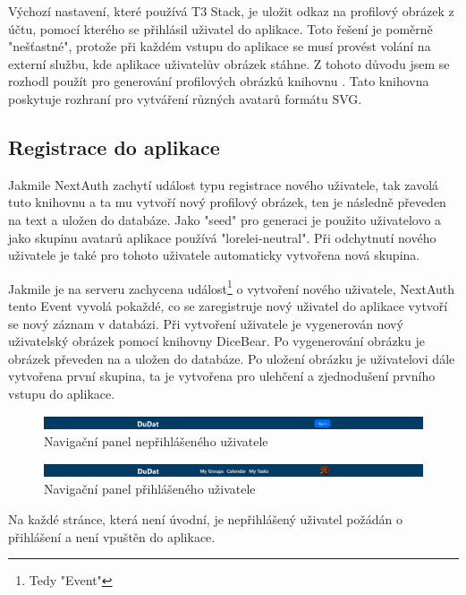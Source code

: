 Výchozí nastavení, které používá T3 Stack, je uložit odkaz na profilový obrázek z účtu, pomocí kterého se přihlásil uživatel do aplikace. Toto řešení je poměrně "nešťastné", protože při každém vstupu do aplikace se musí provést volání na externí službu, kde aplikace uživatelův obrázek stáhne. Z tohoto důvodu jsem se rozhodl použít pro generování profilových obrázků knihovnu \cite{dicebear}. Tato knihovna poskytuje rozhraní pro vytváření různých avatarů formátu SVG.

\subsection{Registrace do aplikace}
Jakmile NextAuth zachytí událost typu registrace nového uživatele, tak zavolá tuto knihovnu a ta mu vytvoří nový profilový obrázek, ten je následně převeden na text a uložen do databáze. Jako "seed" pro generaci je použito uživatelovo  a jako skupinu avatarů aplikace používá "lorelei-neutral"\cite{lorelei-neutral}. Při odchytnutí nového uživatele je také pro tohoto uživatele automaticky vytvořena nová skupina.

Jakmile je na serveru zachycena událost\footnote{Tedy "Event"} o vytvoření nového uživatele, NextAuth tento Event vyvolá pokaždé, co se zaregistruje nový uživatel do aplikace vytvoří se nový záznam v databázi. Při vytvoření uživatele je vygenerován nový uživatelský obrázek pomocí knihovny DiceBear. Po vygenerování obrázku je obrázek převeden na  a uložen do databáze. Po uložení obrázku je uživatelovi dále vytvořena první skupina, ta je vytvořena pro ulehčení a zjednodušení prvního vstupu do aplikace.

\begin{figure}[hbt!]
	\includegraphics[width=1\linewidth]{img/neprihlasenyNavbar.png}
	\caption{Navigační panel nepřihlášeného uživatele}
\end{figure}
\begin{figure}[hbt!]
	\includegraphics[width=1\linewidth]{img/prihlasenyNavbar.png}
	\caption{Navigační panel přihlášeného uživatele}
\end{figure}
\clearpage
Na každé stránce, která není úvodní, je nepřihlášený uživatel požádán o přihlášení a není vpuštěn do aplikace.

